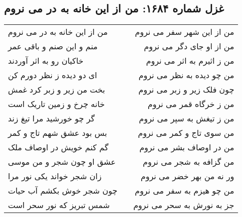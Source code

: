 \begin{center}
\section*{غزل شماره ۱۶۸۴: من از این خانه به در می نروم}
\label{sec:1684}
\begin{longtable}{l p{0.5cm} r}
من از این خانه به در می نروم
&&
من از این شهر سفر می نروم
\\
منم و این صنم و باقی عمر
&&
من از او جای دگر می نروم
\\
خاکیان رو به اثر آوردند
&&
من ز اثیرم به اثر می نروم
\\
ای دو دیده ز نظر دورم کن
&&
من چو دیده به نظر می نروم
\\
بخت من زیر و زبر کرد غمش
&&
چون فلک زیر و زبر می نروم
\\
خانه چرخ و زمین تاریک است
&&
من ز خرگاه قمر می نروم
\\
گر چو خورشید مرا تیغ زند
&&
من ز تیغش به سپر می نروم
\\
بس بود عشق شهم تاج و کمر
&&
من سوی تاج و کمر می نروم
\\
گم کنم خویش در اوصاف ملک
&&
من در اوصاف بشر می نروم
\\
عشق او چون شجر و من موسی
&&
من گزافه به شجر می نروم
\\
زان شجر خواند یکی نور مرا
&&
ور نه من بهر خضر می نروم
\\
چون شجر خوش بکشم آب حیات
&&
من چو هیزم به سفر می نروم
\\
شمس تبریز که نور سحر است
&&
جز به نورش به سحر می نروم
\\
\end{longtable}
\end{center}
